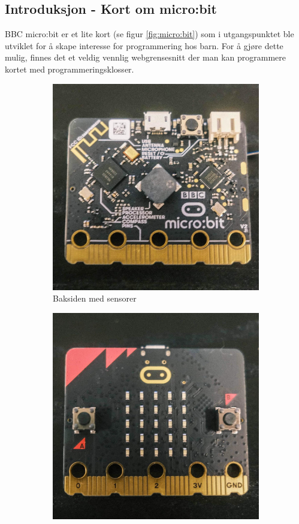 \begin{alphasection}
\section{Introduksjon - Kort om micro:bit}
BBC micro:bit er et lite kort (se figur \ref{fig:micro:bit}) som i utgangspunktet ble utviklet for å skape interesse for programmering hos barn. For å gjøre dette mulig, finnes det et veldig vennlig webgrensesnitt der man kan programmere kortet med programmeringsklosser. 

\begin{figure}[H]
    \centering
    \begin{subfigure}{0.5\textwidth}
    \centering
        \includegraphics[width=.8\linewidth]{figures/microbit1}
        \caption{Baksiden med sensorer}
        \label{fig:inclu}
    \end{subfigure}%
    \begin{subfigure}{0.5\textwidth}
    \centering
        \includegraphics[width=0.8\linewidth]{figures/microbit2}

\end{subfigure}
\end{figure}
\end{alphasection}
